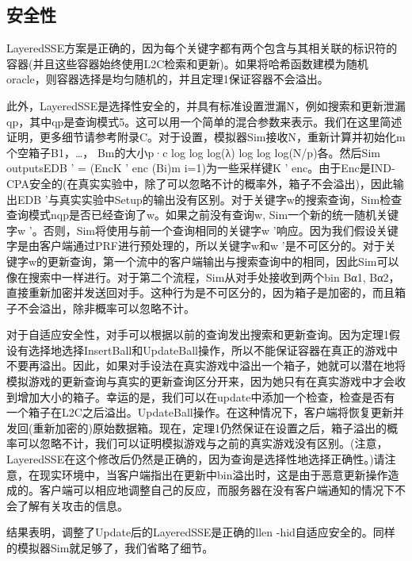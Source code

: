 \documentclass[UTF8]{article}
\begin{document}
\subsection{安全性}
LayeredSSE方案是正确的，因为每个关键字都有两个包含与其相关联的标识符的容器(并且这些容器始终使用L2C检索和更新)。如果将哈希函数建模为随机oracle，则容器选择是均匀随机的，并且定理1保证容器不会溢出。

此外，LayeredSSE是选择性安全的，并具有标准设置泄漏N，例如搜索和更新泄漏qp，其中qp是查询模式5。这可以用一个简单的混合参数来表示。我们在这里简述证明，更多细节请参考附录C。对于设置，模拟器Sim接收N，重新计算并初始化m个空箱子B1，…， Bm的大小p·c log log log(λ) log log log(N/p)各。然后Sim outputsEDB ' = (EncK ' enc (Bi)m i=1)为一些采样键K ' enc。由于Enc是IND-CPA安全的(在真实实验中，除了可以忽略不计的概率外，箱子不会溢出)，因此输出EDB '与真实实验中Setup的输出没有区别。对于关键字w的搜索查询，Sim检查查询模式nqp是否已经查询了w。如果之前没有查询w, Sim一个新的统一随机关键字w '。否则，Sim将使用与前一个查询相同的关键字w '响应。因为我们假设关键字是由客户端通过PRF进行预处理的，所以关键字w和w '是不可区分的。对于关键字w的更新查询，第一个流中的客户端输出与搜索查询中的相同，因此Sim可以像在搜索中一样进行。对于第二个流程，Sim从对手处接收到两个bin Bα1, Bα2，直接重新加密并发送回对手。这种行为是不可区分的，因为箱子是加密的，而且箱子不会溢出，除非概率可以忽略不计。

对于自适应安全性，对手可以根据以前的查询发出搜索和更新查询。因为定理1假设有选择地选择InsertBall和UpdateBall操作，所以不能保证容器在真正的游戏中不要再溢出。因此，如果对手设法在真实游戏中溢出一个箱子，她就可以潜在地将模拟游戏的更新查询与真实的更新查询区分开来，因为她只有在真实游戏中才会收到增加大小的箱子。幸运的是，我们可以在update中添加一个检查，检查是否有一个箱子在L2C之后溢出。UpdateBall操作。在这种情况下，客户端将恢复更新并发回(重新加密的)原始数据箱。现在，定理1仍然保证在设置之后，箱子溢出的概率可以忽略不计，我们可以证明模拟游戏与之前的真实游戏没有区别。(注意，LayeredSSE在这个修改后仍然是正确的，因为查询是选择性地选择正确性。)请注意，在现实环境中，当客户端指出在更新中bin溢出时，这是由于恶意更新操作造成的。客户端可以相应地调整自己的反应，而服务器在没有客户端通知的情况下不会了解有关攻击的信息。

结果表明，调整了Update后的LayeredSSE是正确的llen -hid自适应安全的。同样的模拟器Sim就足够了，我们省略了细节。


\end{document}
